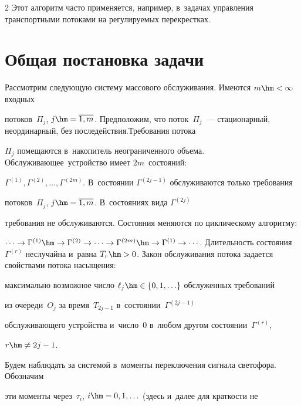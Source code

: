 \begin{multicols}{2}
Этот алгоритм часто применяется, например, в~задачах управления транспортными потоками на регулируемых перекрестках.



\vspace*{-6pt}



\section{Общая постановка задачи}



\vspace*{-3pt}



Рассмотрим следующую систему массового обслуживания.  Имеются $m\hm<\infty$ входных

потоков~$\Pi_j$, $j\hm=\overline{1, m}$. Предположим, что поток~$\Pi_j$~--- ста\-ционарный, неординарный, без последействия.\linebreak  Требования потока

$\Pi_j$ помещаются в~накопитель неограниченного объема.  Обслуживающее~устройство имеет $2m$~состояний: 

$\Gamma^{(1)}, \Gamma^{(2)}, \ldots,

\Gamma^{(2m)}$. В~состоянии $\Gamma^{(2j-1)}$ обслуживаются только требования

потоков~$\Pi_j$, $j\hm=\overline{1, m}$. В~состояниях вида $\Gamma^{(2j)}$

требования не обслуживаются. Состояния меняются по циклическому алгоритму:

$\cdots\to\Gamma^{(1)}\hm\to \Gamma^{(2)} \to \cdots \to \Gamma^{(2m)}\hm\to

\Gamma^{(1)} \to \cdots$. Длительность состояния~$\Gamma^{(r)}$ неслучайна и~равна $T_r\hm>0$.  Закон обслуживания потока задается свойствами потока насыщения:

максимально возможное число $\ell_j\hm\in\{0, 1, \ldots\}$ обслуженных требований

из очереди~$O_j$ за время~$T_{2j-1}$ в~состоянии~$\Gamma^{(2j-1)}$

обслуживающего устройства и~число~0 в~любом другом состоянии~$\Gamma^{(r)}$,

$r\hm\neq 2j-1$.



Будем наблюдать за системой в~моменты переключения сигнала светофора. Обозначим

эти моменты через~$\tau_i$, $i\hm=0, 1, \ldots$ (здесь и~далее для краткости не


\end{multicols}
